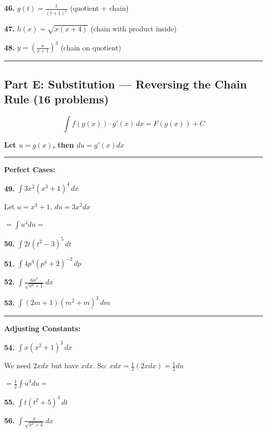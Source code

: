 \documentclass[
  11pt,
]{article}
\begin{document}
\textbf{46.} \(g(t) = \frac{t}{(t + 1)^2}\) (quotient + chain)

\textbf{47.} \(h(x) = \sqrt{x(x + 4)}\) (chain with product inside)

\textbf{48.} \(y = \left(\frac{x}{x+1}\right)^3\) (chain on quotient)

\begin{center}\rule{0.5\linewidth}{0.5pt}\end{center}

\hypertarget{part-e-substitution-reversing-the-chain-rule-16-problems}{%
\subsection{Part E: Substitution --- Reversing the Chain Rule (16
problems)}\label{part-e-substitution-reversing-the-chain-rule-16-problems}}

\[\int f(g(x)) \cdot g'(x) \, dx = F(g(x)) + C\]

\textbf{Let \(u = g(x)\), then \(du = g'(x) dx\)}

\begin{center}\rule{0.5\linewidth}{0.5pt}\end{center}

\textbf{Perfect Cases:}

\textbf{49.} \(\int 3x^2(x^3 + 1)^4 \, dx\)

Let \(u = x^3 + 1\), \(du = 3x^2 dx\)

\(= \int u^4 du ={}\)

\textbf{50.} \(\int 2t(t^2 - 3)^5 \, dt\)

\textbf{51.} \(\int 4p^3(p^4 + 2)^{-2} \, dp\)

\textbf{52.} \(\int \frac{6x^2}{\sqrt{x^3 + 1}} \, dx\)

\textbf{53.} \(\int (2m + 1)(m^2 + m)^3 \, dm\)

\begin{center}\rule{0.5\linewidth}{0.5pt}\end{center}

\textbf{Adjusting Constants:}

\textbf{54.} \(\int x(x^2 + 1)^3 \, dx\)

We need \(2x dx\) but have \(x dx\). So:
\(x dx = \frac{1}{2}(2x dx) = \frac{1}{2}du\)

\(= \frac{1}{2}\int u^3 du ={}\)

\textbf{55.} \(\int t(t^2 + 5)^4 \, dt\)

\textbf{56.} \(\int \frac{x}{\sqrt{x^2 + 4}} \, dx\)
\end{document}

